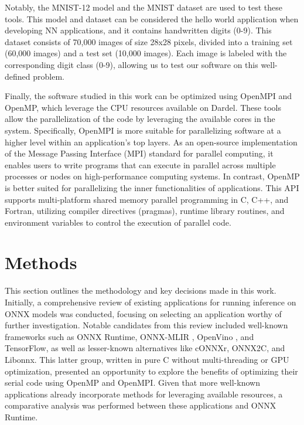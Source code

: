 \documentclass[fleqn,10pt]{olplainarticle}
\begin{document}
Notably, the MNIST-12 model and the MNIST dataset \cite{lecunMNISTHandwrittenDigit2010} are used to test these tools. This model and dataset can be considered the hello world application when developing NN applications, and it contains handwritten digits (0-9). This dataset consists of 70,000 images of size 28x28 pixels, divided into a training set (60,000 images) and a test set (10,000 images). Each image is labeled with the corresponding digit class (0-9), allowing us to test our software on this well-defined problem.

Finally, the software studied in this work can be optimized using OpenMPI and OpenMP, which leverage the CPU resources available on Dardel. These tools allow the parallelization of the code by leveraging the available cores in the system. Specifically, OpenMPI is more suitable for parallelizing software at a higher level within an application's top layers. As an open-source implementation of the Message Passing Interface (MPI) standard for parallel computing, it enables users to write programs that can execute in parallel across multiple processes or nodes on high-performance computing systems. In contrast, OpenMP is better suited for parallelizing the inner functionalities of applications. This API supports multi-platform shared memory parallel programming in C, C++, and Fortran, utilizing compiler directives (pragmas), runtime library routines, and environment variables to control the execution of parallel code.

\section{Methods}
This section outlines the methodology and key decisions made in this work. Initially, a comprehensive review of existing applications for running inference on ONNX models was conducted, focusing on selecting an application worthy of further investigation. Notable candidates from this review included well-known frameworks such as ONNX Runtime, ONNX-MLIR \cite{onnxOnnxmlir2024}, OpenVino \cite{openvinotoolkitOpenvino2024}, and TensorFlow, as well as lesser-known alternatives like cONNXr, ONNX2C, and Libonnx. This latter group, written in pure C without multi-threading or GPU optimization, presented an opportunity to explore the benefits of optimizing their serial code using OpenMP and OpenMPI. Given that more well-known applications already incorporate methods for leveraging available resources, a comparative analysis was performed between these applications and ONNX Runtime.
\end{document}
